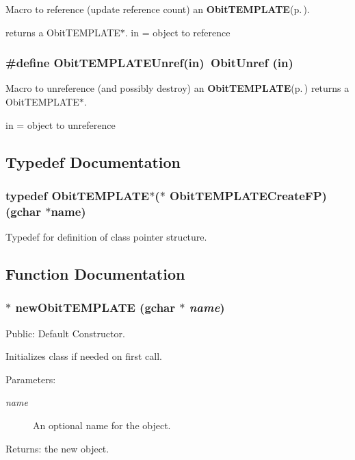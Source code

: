 Macro to reference (update reference count) an {\bf Obit\-TEMPLATE}{\rm (p.\,\pageref{structObitTEMPLATE})}. 

returns a Obit\-TEMPLATE$\ast$. in = object to reference 
\subsubsection{\setlength{\rightskip}{0pt plus 5cm}\#define Obit\-TEMPLATEUnref(in)\ Obit\-Unref (in)}\label{ObitTEMPLATE_8h_a0}


Macro to unreference (and possibly destroy) an {\bf Obit\-TEMPLATE}{\rm (p.\,\pageref{structObitTEMPLATE})} returns a Obit\-TEMPLATE$\ast$. 

in = object to unreference 

\subsection{Typedef Documentation}
\subsubsection{\setlength{\rightskip}{0pt plus 5cm}typedef {\bf Obit\-TEMPLATE}$\ast$($\ast$ {\bf Obit\-TEMPLATECreate\-FP})(gchar $\ast$name)}\label{ObitTEMPLATE_8h_a3}


Typedef for definition of class pointer structure. 



\subsection{Function Documentation}
\subsubsection{$\ast$ new\-Obit\-TEMPLATE (gchar $\ast$ {\em name})}\label{ObitTEMPLATE_8h_a5}


Public: Default Constructor. 

Initializes class if needed on first call. \begin{Desc}
\item[Parameters:]
\begin{description}
\item[{\em name}]An optional name for the object. \end{description}
\end{Desc}
\begin{Desc}
\item[Returns:]the new object. \end{Desc}
